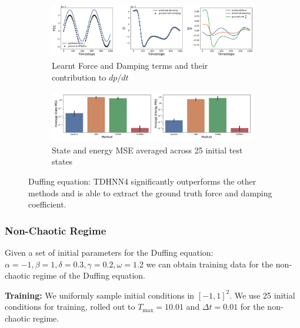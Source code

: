 \documentclass{article}
\begin{document}
\begin{figure}[h!]
\centering
\captionsetup{justification=centering}
	\begin{subfigure}[b]{0.48\textwidth}
		\centering
		\includegraphics[width=\textwidth]{figures/figures/duffing/1/duffing_dpdt_0.pdf}
		\caption{Learnt Force and Damping terms and their contribution to $dp/dt$}
	\end{subfigure}
	\begin{subfigure}[b]{0.48\textwidth}
	    \centering
		\includegraphics[width=\textwidth]{figures/figures/duffing/1/duffing_errors_0.pdf}
		\caption{State and energy MSE averaged across 25 initial test states}
	\end{subfigure}
\caption{Duffing equation: TDHNN4 significantly outperforms the other methods and is able to extract the ground truth force and damping coefficient.}
\label{fig.duffing}
\end{figure}

\subsubsection{Non-Chaotic Regime}

Given a set of initial parameters for the Duffing equation: $\alpha =-1,\beta=1,\delta=0.3,\gamma=0.2,\omega=1.2$ we can obtain training data for the non-chaotic regime of the Duffing equation. 

\textbf{Training:} We uniformly sample initial conditions in $[-1,1]^2$. We use 25 initial conditions for training, rolled out to $T_{\max}=10.01$ and $\Delta t =0.01$ for the non-chaotic regime. 
\end{document}
